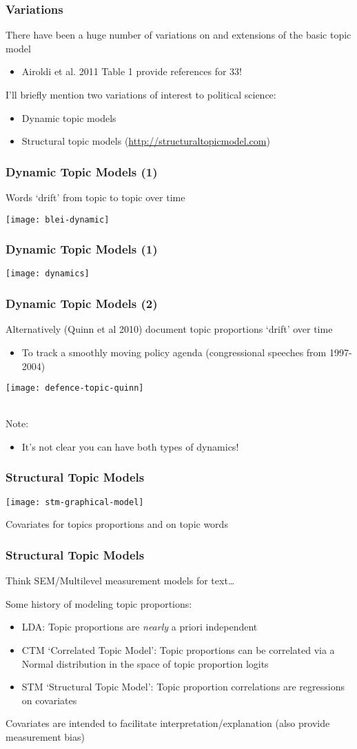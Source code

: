 \documentclass[11pt,compress,professionalfonts]{beamer}
\newcommand{\ita}{\begin{itemize}}
\newcommand{\itm}{\item[]}
\newcommand{\itz}{\end{itemize}}
\begin{document}
\begin{frame}[t,fragile]\frametitle{Variations}

There have been a huge number of variations on and extensions of the basic topic model
\ita
\itm Airoldi et al. 2011 Table 1 provide references for 33!
\itz
I'll briefly mention two variations of interest to political science:
\ita
\itm Dynamic topic models
\itm Structural topic models (\url{http://structuraltopicmodel.com})
\itz

\end{frame}
\begin{frame}[t,fragile]\frametitle{Dynamic Topic Models (1)}

Words `drift' from topic to topic over time

\centerline{\texttt{[image: blei-dynamic]}}

\end{frame}
\begin{frame}[t,fragile]\frametitle{Dynamic Topic Models (1)}

\centerline{\texttt{[image: dynamics]}}

\end{frame}
\begin{frame}[t,fragile]\frametitle{Dynamic Topic Models (2)}

Alternatively (Quinn et al 2010) document topic proportions `drift' over time
\ita
\itm To track a smoothly moving policy agenda (congressional speeches from 1997-2004)
\itz

\centerline{\texttt{[image: defence-topic-quinn]}}

~\\
Note:
\ita
\itm It's not clear you can have both types of dynamics!
\itz

\end{frame}
\begin{frame}[t,fragile]\frametitle{Structural Topic Models}

\centerline{\texttt{[image: stm-graphical-model]}}

Covariates for topics proportions and on topic words

\end{frame}
\begin{frame}[t,fragile]\frametitle{Structural Topic Models}

Think SEM/Multilevel measurement models for text\ldots

Some history of modeling topic proportions:
\ita
\itm LDA: Topic proportions are \textit{nearly} a priori independent
\itm CTM `Correlated Topic Model': Topic proportions can be correlated via a Normal distribution in the space of topic proportion logits
\itm STM `Structural Topic Model': Topic proportion correlations are regressions on covariates
\itz

Covariates are intended to facilitate interpretation/explanation (also provide measurement bias)

\end{frame}
\end{document}
